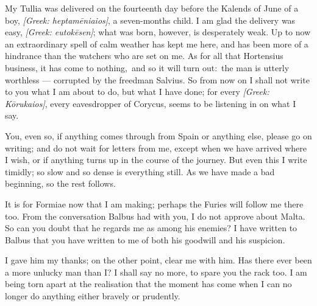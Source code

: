 

 My Tullia was delivered on the fourteenth day before the Kalends of June of a boy, \textit{[Greek: heptam\=eniaios]}, a seven-months child. I am glad the delivery was easy, \textit{[Greek: eutok\=esen]}; what was born, however, is desperately weak. Up to now an extraordinary spell of calm weather has kept me here, and has been more of a hindrance than the watchers who are set on me. As for all that Hortensius business, \dag it has come to nothing,\dag\ \dag and so it will turn out:\dag\ the man is utterly worthless --- corrupted by the freedman Salvius. So from now on I shall not write to you what I am about to do, but what I have done; for every \textit{[Greek: K\=orukaios]}, every eavesdropper of Corycus, seems to be listening in on what I say.

 You, even so, if anything comes through from Spain or anything else, please go on writing; and do not wait for letters from me, except when we have arrived where I wish, or if anything turns up in the course of the journey. But even this I write timidly; so slow and so dense is everything still. As we have made a bad beginning, so the rest follows.

 It is for Formiae now that I am making; perhaps the Furies will follow me there too. From the conversation Balbus had with you, I do not approve about Malta. So can you doubt that he regards me as among his enemies? I have written to Balbus that you have written to me of both his goodwill and his suspicion.

 I gave him my thanks; on the other point, clear me with him. Has there ever been a more unlucky man than I? I shall say no more, to spare you the rack too. I am being torn apart at the realisation that the moment has come when I can no longer do anything either bravely or prudently.
